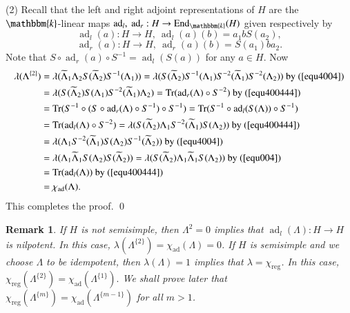 \documentclass[11pt]{amsart}
\newtheorem{rem}[thm]{Remark}
\numberwithin{equation}{section}
\begin{document}
(2) Recall that the left and right adjoint representations of $H$ are the $\mathbbm{k}$-linear maps $\operatorname{ad}_l,\ \operatorname{ad}_r:H\rightarrow \operatorname{End}_{\mathbbm{k}}(H)$ given respectively by
$$\operatorname{ad}_l(a):H\rightarrow H,\ \operatorname{ad}_l(a)(b)=a_1bS(a_2),$$ $$\operatorname{ad}_r(a):H\rightarrow H,\ \operatorname{ad}_r(a)(b)=S(a_1)ba_2.$$ 
Note that $S\circ \operatorname{ad}_r(a)\circ S^{-1}=\operatorname{ad}_l(S(a))$ for any $a\in H$. Now
\begin{align*}
\lambda(\Lambda^{\{2\}})&=\lambda(\widetilde{\Lambda}_1\Lambda_2S(\widetilde{\Lambda}_2)S^{-1}(\Lambda_1))
=\lambda(S(\widetilde{\Lambda}_2)S^{-1}(\Lambda_1)S^{-2}(\widetilde{\Lambda}_1)S^{-2}(\Lambda_2))\ \text{by}\ (\ref{equ4004})\\
&=\lambda(S(\widetilde{\Lambda}_2)S(\Lambda_1)S^{-2}(\widetilde{\Lambda}_1)\Lambda_2)
=\text{Tr}(\operatorname{ad}_r(\Lambda)\circ S^{-2})\ \text{by}\ (\ref{equ400444})\\
&=\text{Tr}(S^{-1}\circ(S\circ \operatorname{ad}_r(\Lambda)\circ S^{-1})\circ S^{-1})=\text{Tr}(S^{-1}\circ \operatorname{ad}_l(S(\Lambda))\circ S^{-1})\\
&=\text{Tr}(\operatorname{ad}_l(\Lambda)\circ S^{-2})=\lambda(S(\widetilde{\Lambda}_2)\Lambda_1S^{-2}(\widetilde{\Lambda}_1)S(\Lambda_2))\ \text{by}\ (\ref{equ400444})\\
&=\lambda(\Lambda_1S^{-2}(\widetilde{\Lambda}_1)S(\Lambda_2)S^{-1}(\widetilde{\Lambda}_2))\ \text{by}\ (\ref{equ4004})\\
&=\lambda(\Lambda_1\widetilde{\Lambda}_1S(\Lambda_2)S(\widetilde{\Lambda}_2))=\lambda(S(\widetilde{\Lambda}_2)\Lambda_1\widetilde{\Lambda}_1S(\Lambda_2))\ \text{by}\ (\ref{equ004})\\
&=\text{Tr}(\operatorname{ad}_l(\Lambda))\ \text{by}\ (\ref{equ400444})\\
&=\chi_{\operatorname{ad}}(\Lambda).
\end{align*}
This completes the proof.
\qed

\begin{rem}
If $H$ is not semisimple, then $\Lambda^2=0$ implies that $\operatorname{ad}_l(\Lambda):H\rightarrow H$ is nilpotent. In this case, $\lambda(\Lambda^{\{2\}})=\chi_{\operatorname{ad}}(\Lambda)=0$. If $H$ is semisimple and we choose $\Lambda$ to be idempotent, then $\lambda(\Lambda)=1$ implies that $\lambda=\chi_{\operatorname{reg}}$. In this case,  $\chi_{\operatorname{reg}}(\Lambda^{\{2\}})=\chi_{\operatorname{ad}}(\Lambda^{\{1\}}).$ We shall prove later that $\chi_{\operatorname{reg}}(\Lambda^{\{m\}})=\chi_{\operatorname{ad}}(\Lambda^{\{m-1\}})$ for all $m>1$.
\end{rem}
\end{document}
